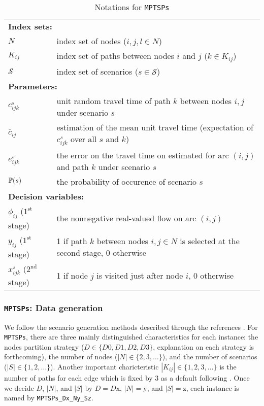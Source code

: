 \begin{table}[H]
	\caption{Notations for \texttt{MPTSPs}}
	\label{mptsps:notation}
	\resizebox{\textwidth}{!}
	{
		\begin{tabular}{ll}
			\toprule
			\multicolumn{2}{l}{\textbf{Index sets:}} \\
			$N$ & \textrm{index set of nodes ($i,j,l\in N$)} \\ 
			$K_{ij}$ & \textrm{index set of paths between nodes $i$ and $j$ ($k\in K_{ij}$)} \\ 
			$\mathcal{S}$ & \textrm{index set of scenarios ($s\in \mathcal{S}$)}\\ \midrule
			\multicolumn{2}{l}{\textbf{Parameters:}} \\
			$c_{ijk}^{s}$ & \textrm{unit random travel time of path $k$ between nodes $i,j$ under scenario $s$} \\ 
			$\bar{c}_{ij}$ & \textrm{estimation of the mean unit travel time (expectation of $c_{ijk}^{s}$ over all $s$ and $k$)} \\ 
			$e_{ijk}^{s}$ & \textrm{the error on the travel time on estimated for arc $(i,j)$ and path $k$ under scenario $s$} \\ 
			$\operatorname*{\mathbb{P}}(s)$ & \textrm{the probability of occurence of scenario $s$} \\  \midrule
			\multicolumn{2}{l}{\textbf{Decision variables:}} \\
			$\phi_{ij}$ ($1^{\textrm{st}}$ stage) & \textrm{the nonnegative real-valued flow on arc $(i,j)$}\\
			$y_{ij}$ ($1^{\textrm{st}}$ stage)& \textrm{1 if path $k$ between nodes $i,j\in N$ is selected at the second stage, 0 otherwise} \\  
			$x_{ijk}^{s}$ ($2^{\textrm{nd}}$ stage) & \textrm{1 if node $j$ is visited just after node $i$, 0 otherwise} \\ 
			\bottomrule
		\end{tabular}
	}
\end{table} 


\subsubsection{\texttt{MPTSPs}: Data generation}
We follow the scenario generation methods described through the references \cite{journal:MPT2014,journal:PGM2017,journal:TPP2017}. For \texttt{MPTSPs}, there are three mainly distinguished characteristics for each instance: the nodes partition strategy ($D\in\{D0,D1,D2,D3\}$, explanation on each strategy is forthcoming), the number of nodes ($|N|\in\{2,3,\ldots\}$), and the number of scenarios ($|S|\in\{1,2,\ldots\}$). Another important charicteristic $|K_{ij}|\in\{1,2,3,\ldots\}$ is the number of paths for each edge which is fixed by 3 as a default following \cite{journal:TPP2017}. Once we decide $D$, $|N|$, and $|S|$ by $D=D\textrm{x}$, $|N|=\textrm{y}$, and $|S|=\textrm{z}$, each instance is named by \texttt{MPTSPs\_Dx\_Ny\_Sz}.

